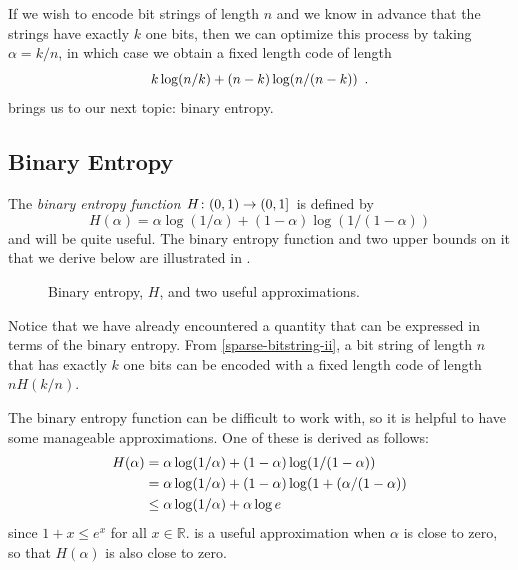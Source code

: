 \documentclass{patmorin}
\begin{document}
If we wish to encode bit strings of length $n$ and we know in advance
that the strings have exactly $k$ one bits, then we can optimize this
process by taking $\alpha=k/n$, in which case we obtain a fixed length
code of length
\begin{equation}
  k\log (n/k) + (n-k)\log(n/(n-k))  \eqlabel{sparse-bitstring-ii} \enspace .
\end{equation}
 brings us to our next topic: binary entropy.

\subsection{Binary Entropy}

The \emph{binary entropy function} $H\colon (0,1)\to(0,1]$ is defined
by
\[
  H(\alpha) = \alpha\log(1/\alpha) + (1-\alpha)\log(1/(1-\alpha)) 
\]
and will be quite useful.  The binary entropy function and two upper
bounds on it that we derive below are illustrated in .

\begin{figure}
  \caption{Binary entropy, $H$, and two useful approximations.}
\end{figure}

Notice that we have already encountered a quantity that can be
expressed in terms of the binary entropy.  From
\eqref{sparse-bitstring-ii}, a bit string of length $n$ that has
exactly $k$ one bits can be encoded with a fixed length code of length
$nH(k/n)$.

The binary entropy function can be difficult to work with, so it is
helpful to have some manageable approximations.  One of these is
derived as follows:
\begin{align}
  H(\alpha) & = \alpha\log(1/\alpha) + (1-\alpha)\log(1/(1-\alpha)) \notag \\
            & = \alpha\log(1/\alpha) + (1-\alpha)\log(1+(\alpha/(1-\alpha)) \notag \\
            & \le \alpha\log(1/\alpha) + \alpha\log e \eqlabel{entropy-i} 
\end{align}
since $1+x\le e^x$ for all $x\in\mathbb{R}$.  is a
useful approximation when $\alpha$ is close to zero, so that
$H(\alpha)$ is also close to zero.
\end{document}
